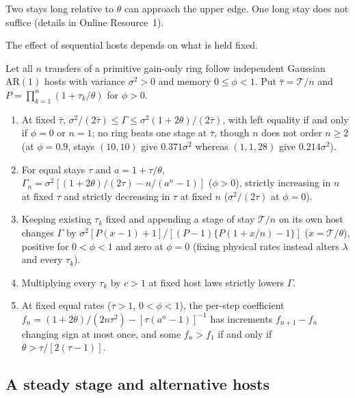Two stays long relative to $\theta$ can approach the upper edge. One long stay does not suffice (details in Online Resource~1).

The effect of sequential hosts depends on what is held fixed.

\begin{proposition}\label{prop:ring-series}
Let all $n$ transfers of a primitive gain-only ring follow independent Gaussian $\mathrm{AR}(1)$ hosts with variance $\sigma^2 > 0$ and memory $0 \le \phi < 1$. Put $\bar{\tau} = \mathcal{T}/n$ and $P = \prod_{k=1}^n (1 + \tau_k/\theta)$ for $\phi > 0$.
\begin{enumerate}
\item[(i)] At fixed $\bar{\tau}$, $\sigma^2/(2\bar{\tau}) \le \Gamma \le \sigma^2(1 + 2\theta)/(2\bar{\tau})$, with left equality if and only if $\phi = 0$ or $n = 1$; no ring beats one stage at $\bar{\tau}$, though $n$ does not order $n \ge 2$ (at $\phi = 0.9$, stays $(10, 10)$ give $0.371\sigma^2$ whereas $(1, 1, 28)$ give $0.214\sigma^2$).
\item[(ii)] For equal stays $\tau$ and $a = 1 + \tau/\theta$, $\Gamma_n = \sigma^2[(1 + 2\theta)/(2\tau) - n/(a^n - 1)]$ ($\phi > 0$), strictly increasing in $n$ at fixed $\tau$ and strictly decreasing in $\tau$ at fixed $n$ ($\sigma^2/(2\tau)$ at $\phi = 0$).
\item[(iii)] Keeping existing $\tau_k$ fixed and appending a stage of stay $\mathcal{T}/n$ on its own host changes $\Gamma$ by $\sigma^2[P(x - 1) + 1]/[(P - 1)\{P(1 + x/n) - 1\}]$ ($x = \mathcal{T}/\theta$), positive for $0 < \phi < 1$ and zero at $\phi = 0$ (fixing physical rates instead alters $\lambda$ and every $\tau_k$).
\item[(iv)] Multiplying every $\tau_k$ by $c > 1$ at fixed host laws strictly lowers $\Gamma$.
\item[(v)] At fixed equal rates ($\tau > 1$, $0 < \phi < 1$), the per-step coefficient $f_n = (1 + 2\theta)/(2n\tau^2) - [\tau(a^n - 1)]^{-1}$ has increments $f_{n+1} - f_n$ changing sign at most once, and some $f_n > f_1$ if and only if $\theta > \tau/[2(\tau - 1)]$.
\end{enumerate}
\end{proposition}

\subsection{A steady stage and alternative hosts}\label{subsec:ring-steady}

